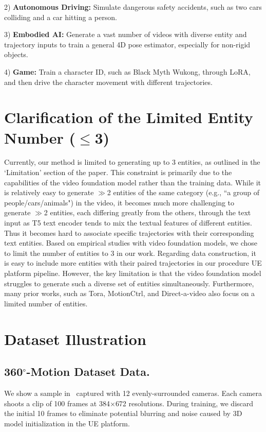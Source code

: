 2) \textbf{Autonomous Driving:}  Simulate dangerous safety accidents, such as two cars colliding and a car hitting a person.

3) \textbf{Embodied AI:} Generate a vast number of videos with diverse entity and trajectory inputs to train a general 4D pose estimator, especially for non-rigid objects.

4) \textbf{Game:} Train a character ID, such as Black Myth Wukong, through LoRA, and then drive the character movement with different trajectories.

\section{Clarification of the Limited Entity Number ($\leq$3)} 

Currently, our method is limited to generating up to 3 entities, as outlined in the `Limitation' section of the paper. This constraint is primarily due to the capabilities of the video foundation model rather than the training data. While it is relatively easy to generate $\gg$2 entities of the same category (e.g., ``a group of people/cars/animals") in the video, it becomes much more challenging to generate $\gg$2 entities, each differing greatly from the others, through the text input as T5 text encoder tends to mix the textual features of different entities. Thus it becomes hard to associate specific trajectories with their corresponding text entities. Based on empirical studies with video foundation models, we chose to limit the number of entities to 3 in our work. Regarding data construction, it is easy to include more entities with their paired trajectories in our procedure UE platform pipeline. However, the key limitation is that the video foundation model struggles to generate such a diverse set of entities simultaneously. Furthermore, many prior works, such as Tora, MotionCtrl, and Direct-a-video also focus on a limited number of entities.

\section{Dataset Illustration} 

\subsection{360$^{\circ}$-Motion Dataset Data.} \label{subsec:360motiondataset}
We show a sample in~ captured with 12 evenly-surrounded cameras. Each camera shoots a clip of 100 frames at 384$\times$672 resolutions. During training, we discard the initial 10 frames to eliminate potential blurring and noise caused by 3D model initialization in the UE platform.

